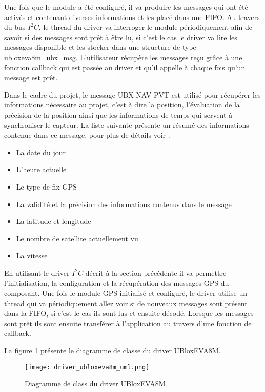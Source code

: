 Une fois que le module a été configuré, il va produire les messages qui ont été activés et contenant diverses informations et les placé dans une FIFO. Au travers du bus $I^{2}C$, le thread du driver va interroger le module périodiquement afin de savoir si des messages sont prêt à être lu, si c'est le cas le driver va lire les messages disponible et les stocker dans une structure de type ubloxeva8m\_ubx\_msg. L'utilisateur récupère les messages reçu grâce à une fonction callback qui est passée au driver et qu'il appelle à chaque fois qu'un message est prêt.

Dans le cadre du projet, le message UBX-NAV-PVT est utilisé pour récupérer les informations nécessaire au projet, c'est à dire la position, l'évaluation de la précision de la position ainsi que les informations de temps qui servent à synchroniser le capteur. La liste suivante présente un résumé des informations contenue dans ce message, pour plus de détails voir \cite[p.~307]{ublox-protocol}.

\begin{itemize}
 \item La date du jour
 \item L'heure actuelle 
 \item Le type de fix GPS
 \item La validité et la précision des informations contenus dans le message
 \item La latitude et longitude
 \item Le nombre de satellite actuellement vu
 \item La vitesse
 \end{itemize} 

En utilisant le driver $I^{2}C$ décrit à la section précédente il va permettre l'initialisation, la configuration et la récupération des messages GPS du composant. Une fois le module GPS initialisé et configuré, le driver utilise un thread qui va périodiquement allez voir si de nouveaux messages sont présent dans la FIFO, si c'est le cas ils sont lus et ensuite décodé. Lorsque les messages sont prêt ils sont ensuite transférer à l'application au travers d'une fonction de callback.

La figure \ref{fig:driver_ubloxeva8m_uml} présente le diagramme de classe du driver UBloxEVA8M.

\begin{figure}[htb]
\centering 
\texttt{[image: driver\_ubloxeva8m\_uml.png]} 
\caption{Diagramme de class du driver UBloxEVA8M}
\label{fig:driver_ubloxeva8m_uml}
\end{figure}

